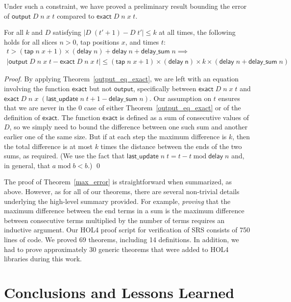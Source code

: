 \documentclass{llncs}
\begin{document}
Under such a constraint, we have proved a preliminary result bounding the error of $\mathsf{output}\;D\;n\;x\;t$ compared to $\mathsf{exact}\;D\;n\;x\;t$.
\begin{theorem}\label{max_error}
For all $k$ and $D$ satisfying $|D\;(t'+1)-D\;t'|\leq k$ at all times, the following holds for all slices $n>0$, tap positions $x$, and times $t$:
\begin{multline*}
t>(\mathsf{tap}\;n\;x+1)\times(\mathsf{delay}\;n)+\mathsf{delay}\;n+\mathsf{delay\_sum}\;n\implies\\
|\mathsf{output}\;D\;n\;x\;t-\mathsf{exact}\;D\;n\;x\;t|\leq(\mathsf{tap}\;n\;x+1)\times(\mathsf{delay\;n})\times k\times(\mathsf{delay}\;n+\mathsf{delay\_sum}\;n)
\end{multline*}
\end{theorem}
\begin{proof}
By applying Theorem~\ref{output_eq_exact}, we are left with an equation involving the function $\mathsf{exact}$ but not $\mathsf{output}$, specifically between $\mathsf{exact}\;D\;n\;x\;t$ and $\mathsf{exact}\;D\;n\;x\;(\mathsf{last\_update}\;n\;t+1-\mathsf{delay\_sum}\;n)$.
Our assumption on $t$ ensures that we are never in the $0$ case of either Theorem~\ref{output_eq_exact} or of the definition of $\mathsf{exact}$.
The function $\mathsf{exact}$ is defined as a sum of consecutive values of $D$, so we simply need to bound the difference between one such sum and another earlier one of the same size.
But if at each step the maximum difference is $k$, then the total difference is at most $k$ times the distance between the ends of the two sums, as required.
(We use the fact that $\mathsf{last\_update}\;n\;t=t-t\operatorname{mod}\mathsf{delay}\;n$ and, in general, that $a\operatorname{mod}b<b$.) \qed
\end{proof}

The proof of Theorem~\ref{max_error} is straightforward when summarized, as above.
However, as for all of our theorems, there are several non-trivial details underlying the high-level summary provided.
For example, \emph{proving} that the maximum difference between the end terms in a sum is the maximum difference between consecutive terms multiplied by the number of terms requires an inductive argument.
Our HOL4 proof script for verification of SRS consists of 750 lines of code.
We proved 69 theorems, including 14 definitions.
In addition, we had to prove approximately 30 generic theorems that were added to HOL4 libraries during this work.

\section{Conclusions and Lessons Learned}
\label{sec-conclusions}
\end{document}
